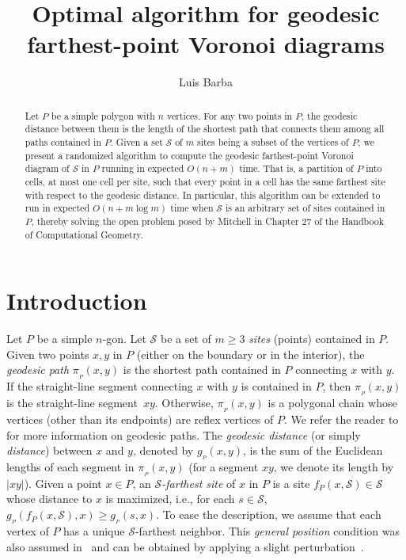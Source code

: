 \documentclass[a4paper,UKenglish]{socg-lipics-v2018}
\title{Optimal algorithm for geodesic farthest-point Voronoi diagrams}
\author{Luis Barba}{Department of Computer Science, ETH Z\"urich, Switzerland}{luis.barba@inf.ethz.ch}{}{}
\newcommand{\s}{\mathcal S}
\newcommand{\g}[3][P]{\ensuremath{g{_{_{#1}}}(#2, #3)}}
\newcommand{\p}[3][P]{\ensuremath{\pi_{_{#1}}(#2, #3)}}
\newcommand{\f}[2][P]{\ensuremath{f_{\scriptscriptstyle #1}(#2)}}
\begin{document}
\maketitle

\begin{abstract}
Let $P$ be a simple polygon with $n$ vertices.
For any two points in $P$, the geodesic distance between them is the length of the shortest path that connects them among all paths contained in $P$. 
Given a set $\s$ of $m$ sites being a subset of  the vertices of $P$, we present a randomized algorithm to compute the geodesic farthest-point Voronoi diagram of $\s$ in $P$ running in expected $O(n + m)$ time. 
That is, a partition of $P$ into cells, at most one cell per site, such that every point in a cell has the same farthest site with respect to the geodesic distance. 
In particular, this algorithm can be extended to run in expected $O(n + m\log m)$ time when $\s$ is an arbitrary set of sites contained in $P$, thereby solving the open problem posed by Mitchell in Chapter 27 of the Handbook of Computational Geometry.
\end{abstract}



\section{Introduction}
Let $P$ be a simple $n$-gon.
Let $\s$ be a set of $m\geq 3$ \emph{sites} (points) contained in $P$. 
Given two points $x,y$ in $P$ (either on the boundary or in the interior), the \emph{geodesic path} $\p{x}{y}$ is the shortest path contained in $P$ connecting $x$ with $y$. If the straight-line segment connecting $x$ with $y$ is contained in $P$, then $\p{x}{y}$ is the straight-line segment~$xy$. 
Otherwise, $\p{x}{y}$ is a polygonal chain whose vertices (other than its endpoints) are  reflex vertices of $P$. 
We refer the reader to~\cite{m-gspno-00} for more information on geodesic paths.
The \emph{geodesic distance} (or simply \emph{distance}) between $x$ and $y$, denoted by $\g{x}{y}$, is the sum of the Euclidean lengths of each segment in $\p{x}{y}$ (for a segment $xy$, we denote its length by $|xy|$). 
Given a point $x\in P$, an \emph{$\s$-farthest site} of $x$ in $P$ is a site $\f{x, \s} \in \s$ whose distance to $x$ is maximized, i.e., for each $s\in \s$, $\g{\f{x,\s}}{x} \geq \g{s}{x}$.
To ease the description, we assume that each vertex of $P$ has a unique $\s$-farthest neighbor. 
This \emph{general position} condition was also assumed in~\cite{ahn2015linear,aronov1993furthest,oh2016farthest} and can be obtained by applying a slight perturbation~\cite{edelsbrunner1990simulation}.
\end{document}
